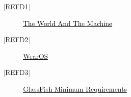 \begin{center}
    \begin{description}
        \item [|REFD1|] \href{http://mcs.open.ac.uk/mj665/icse17kn.pdf}{The World And The Machine}
        \item[|REFD2|] \href{https://wearos.google.com/}{WearOS}
        \item[|REFD3|] \href{https://docs.oracle.com/cd/E19226-01/820-7688/abpaj/index.html}{GlassFish Minimum Requirements}
    \end{description}
\end{center}